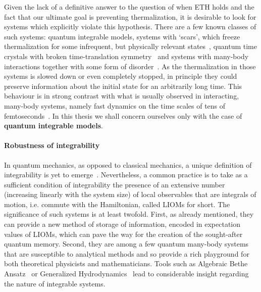 Given the lack of a definitive answer to the question of when ETH holds and the fact that our 
ultimate goal is preventing thermalization, it is desirable to look for systems
which explicitly violate this hypothesis. There are a few known classes of such systems:
quantum integrable models, systems with `scars', which freeze thermalization for
some infrequent, but physically relevant states~\autocite{Turner2018a,Turner2018}, quantum time crystals with
broken time-translation symmetry~\autocite{Wilczek2012,Sacha2017} and systems with many-body interactions together
with some form of disorder~\autocite{Basko_2006}. As the thermalization in those systems is slowed down or even
completely stopped, in principle they could preserve information about the initial state for an arbitrarily long time. 
This behaviour is in strong contrast with what is usually observed in interacting, many-body systems, namely fast
dynamics on the time scales of tens of femtoseconds~\autocite{DalConte2015}.
In this thesis we shall concern ourselves only with the case of \textbf{quantum integrable models}.

\paragraph{Robustness of integrability} 
In quantum mechanics, as opposed to classical mechanics, a unique definition of integrability
is yet to emerge~\autocite{Caux2011,Yuzbashyan2013}. Nevertheless, a common practice is to take as a sufficient condition of
integrability the presence of an extensive number (increasing linearly with the system size) of local observables
that are integrals of motion, i.e. commute with the Hamiltonian, called LIOMs for short. The significance of such
systems is at least twofold. 
First, as already mentioned, they can provide a new method of storage of information, encoded in expectation values
of LIOMs, which can pave the way for the creation of the sought-after quantum memory.
Second, they are among a few quantum many-body systems that are susceptible to analytical methods and so provide
a rich playground for both theoretical physicists and mathematicians. Tools such as Algebraic Bethe
Ansatz~\autocite{Faddeev1995,Faddeev1996,Korepin1993} or Generalized Hydrodynamics~\autocite{Agrawal2020,Friedman2020,
Bertini2021,Bastianello2021,Bulchandani2021} lead to considerable insight regarding the nature of integrable systems.

